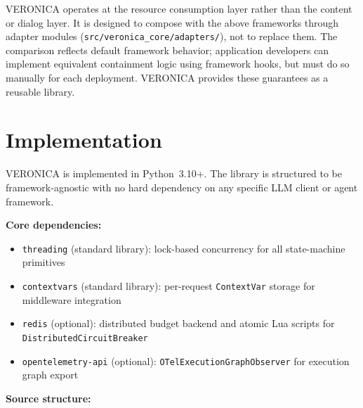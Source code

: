 \documentclass[11pt]{article}
\begin{document}
VERONICA operates at the resource consumption layer rather than the content or
dialog layer. It is designed to compose with the above frameworks through
adapter modules (\texttt{src/veronica\_core/adapters/}), not to replace them.
The comparison reflects default framework behavior; application developers can
implement equivalent containment logic using framework hooks, but must do so
manually for each deployment. VERONICA provides these guarantees as a reusable
library.

\section{Implementation}
\label{sec:implementation}

VERONICA is implemented in Python~3.10+. The library is structured to be
framework-agnostic with no hard dependency on any specific LLM client or agent
framework.

\textbf{Core dependencies:}

\begin{itemize}[nosep]
  \item \texttt{threading} (standard library): lock-based concurrency for all
    state-machine primitives
  \item \texttt{contextvars} (standard library): per-request
    \texttt{ContextVar} storage for middleware integration
  \item \texttt{redis} (optional): distributed budget backend and atomic Lua
    scripts for \texttt{DistributedCircuitBreaker}
  \item \texttt{opentelemetry-api} (optional):
    \texttt{OTelExecutionGraphObserver} for execution graph export
\end{itemize}

\textbf{Source structure:}
\end{document}
